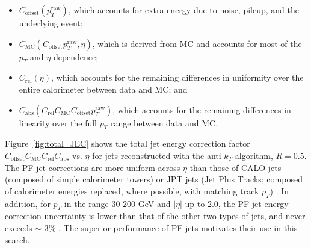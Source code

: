 \documentclass[dissertation.tex]{subfiles}
\begin{document}
\begin{itemize}
\item $C_{\mathrm{offset}}(p_{T}^{\mathrm{raw}})$, which accounts for extra energy due to noise, pileup, and the underlying event;
\item $C_{\mathrm{MC}}(C_{\mathrm{offset}}p_{T}^{\mathrm{raw}}, \eta)$, which is derived from MC and accounts for most of the $p_{T}$ and $\eta$ dependence;
\item $C_{\mathrm{rel}}(\eta)$, which accounts for the remaining differences in uniformity over the entire calorimeter between data and MC; and
\item $C_{\mathrm{abs}}(C_{\mathrm{rel}}C_{\mathrm{MC}}C_{\mathrm{offset}}p_{T}^{\mathrm{raw}})$, which accounts for the remaining differences in linearity over the full $p_{T}$ range between data and MC.
\end{itemize}

Figure~\ref{fig:total_JEC} shows the total jet energy correction factor $C_{\mathrm{offset}}C_{\mathrm{MC}}C_{\mathrm{rel}}C_{\mathrm{abs}}$ vs. $\eta$ for jets reconstructed with the anti-$k_{T}$ algorithm, $R = 0.5$.  The PF jet corrections are more uniform across $\eta$ than those of CALO jets (composed of simple calorimeter towers) or JPT jets (Jet Plus Tracks; composed of calorimeter energies replaced, where possible, with matching track $p_{T}$) \cite{JPT}.  In addition, for $p_{T}$ in the range 30-200 GeV and $|\eta|$ up to 2.0, the PF jet energy correction uncertainty is lower than that of the other two types of jets, and never exceeds $\sim$ 3\% \cite{CMS_JES_paper}.  The superior performance of PF jets motivates their use in this search.
\end{document}
